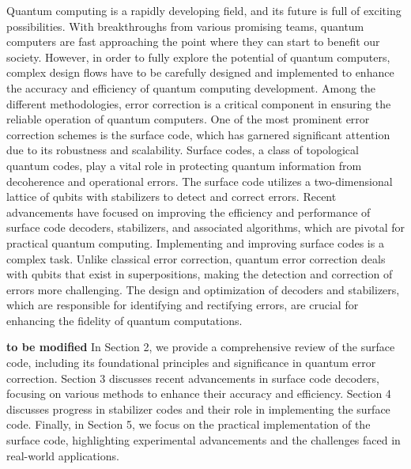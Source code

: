Quantum computing is a rapidly developing field, and its future is full of exciting possibilities. With breakthroughs from various promising teams, quantum computers are fast approaching the point where they can start to benefit our society. However, in order to fully explore the potential of quantum computers, complex design flows have to be carefully designed and implemented to enhance the accuracy and efficiency of quantum computing development. Among the different methodologies, error correction is a critical component in ensuring the reliable operation of quantum computers. One of the most prominent error correction schemes is the surface code, which has garnered significant attention due to its robustness and scalability. Surface codes, a class of topological quantum codes, play a vital role in protecting quantum information from decoherence and operational errors. The surface code utilizes a two-dimensional lattice of qubits with stabilizers to detect and correct errors. Recent advancements have focused on improving the efficiency and performance of surface code decoders, stabilizers, and associated algorithms, which are pivotal for practical quantum computing. Implementing and improving surface codes is a complex task. Unlike classical error correction, quantum error correction deals with qubits that exist in superpositions, making the detection and correction of errors more challenging. The design and optimization of decoders and stabilizers, which are responsible for identifying and rectifying errors, are crucial for enhancing the fidelity of quantum computations.

\textbf{to be modified}
In Section 2, we provide a comprehensive review of the surface code, including its foundational principles and significance in quantum error correction. Section 3 discusses recent advancements in surface code decoders, focusing on various methods to enhance their accuracy and efficiency. Section 4 discusses progress in stabilizer codes and their role in implementing the surface code. Finally, in Section 5, we focus on the practical implementation of the surface code, highlighting experimental advancements and the challenges faced in real-world applications.